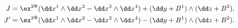 \begin{equation}
\begin{aligned}
   J &= \ex^{2\Phi}(\dd x^1\wedge \dd x^2-\dd x^3\wedge \dd x^4)
         + (\dd y+B^1)\wedge (\dd z+ B^2) , \\
   J' &= \ex^{2\Phi}(\dd x^1\wedge \dd x^2-\dd x^3\wedge \dd x^4)
         -(\dd y+B^1)\wedge (\dd z+ B^2) .
\end{aligned}
\end{equation}

